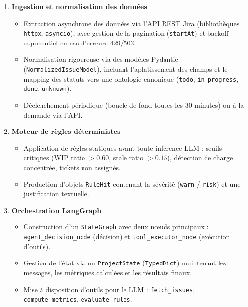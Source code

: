 \begin{enumerate}
    \item \textbf{Ingestion et normalisation des données}
    \begin{itemize}
        \renewcommand{\labelitemi}{—}
        \item Extraction asynchrone des données via l'API REST Jira (bibliothèques \texttt{httpx}, \texttt{asyncio}), avec gestion de la pagination (\texttt{startAt}) et backoff exponentiel en cas d'erreurs 429/503.
        \item Normalisation rigoureuse via des modèles Pydantic (\texttt{NormalizedIssueModel}), incluant l'aplatissement des champs et le mapping des statuts vers une ontologie canonique (\texttt{todo}, \texttt{in\_progress}, \texttt{done}, \texttt{unknown}).
        \item Déclenchement périodique (boucle de fond toutes les 30 minutes) ou à la demande via l'API.
    \end{itemize}
    
    \item \textbf{Moteur de règles déterministes}
    \begin{itemize}
        \renewcommand{\labelitemi}{—}
        \item Application de règles statiques avant toute inférence LLM : seuils critiques (WIP ratio $> 0.60$, stale ratio $> 0.15$), détection de charge concentrée, tickets non assignés.
        \item Production d'objets \texttt{RuleHit} contenant la sévérité (\texttt{warn} / \texttt{risk}) et une justification textuelle.
    \end{itemize}
    
    \item \textbf{Orchestration LangGraph}
    \begin{itemize}
        \renewcommand{\labelitemi}{—}
        \item Construction d'un \texttt{StateGraph} avec deux nœuds principaux : \texttt{agent\_decision\_node} (décision) et \texttt{tool\_executor\_node} (exécution d'outils).
        \item Gestion de l'état via un \texttt{ProjectState} (\texttt{TypedDict}) maintenant les messages, les métriques calculées et les résultats finaux.
        \item Mise à disposition d'outils pour le LLM : \texttt{fetch\_issues}, \texttt{compute\_metrics}, \texttt{evaluate\_rules}.
    \end{itemize}
    

\end{enumerate}
